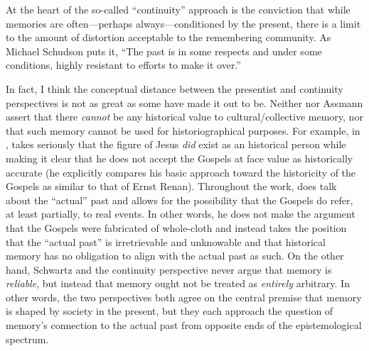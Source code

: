 At the heart of the so-called ``continuity'' approach is the conviction
that while memories are often---perhaps always---conditioned by the
present, there is a limit to the amount of distortion acceptable to the
remembering community. As Michael Schudson puts it, ``The past is in
some respects and under some conditions, highly resistant to efforts to
make it over.''\autocite[107]{schudson_communication1989}

In fact, I think the conceptual distance between the presentist and
continuity perspectives is not as great as some have made it out to be.
Neither \halbwachs nor Assmann assert that there
\emph{cannot} be any historical value to cultural/collective memory, nor
that such memory cannot be used for historiographical purposes. For
example, in ,
\halbwachs takes seriously that the figure of Jesus
\emph{did} exist as an historical person while making it clear that he
does not accept the Gospels at face value as historically accurate (he
explicitly compares his basic approach toward the historicity of the
Gospels as similar to that of Ernst Renan). Throughout the work,
\halbwachs does talk about the ``actual'' past and
allows for the possibility that the Gospels do refer, at least
partially, to real events. In other words, he does not make the argument
that the Gospels were fabricated of whole-cloth and instead takes the
position that the ``actual past'' is irretrievable and unknowable and
that historical memory has no obligation to align with the actual past
as such. On the other hand, Schwartz and the continuity perspective
never argue that memory is \emph{reliable}, but instead that memory
ought not be treated as \emph{entirely} arbitrary. In other words, the
two perspectives both agree on the central premise that memory is shaped
by society in the present, but they each approach the question of
memory's connection to the actual past from opposite ends of the
epistemological spectrum.

